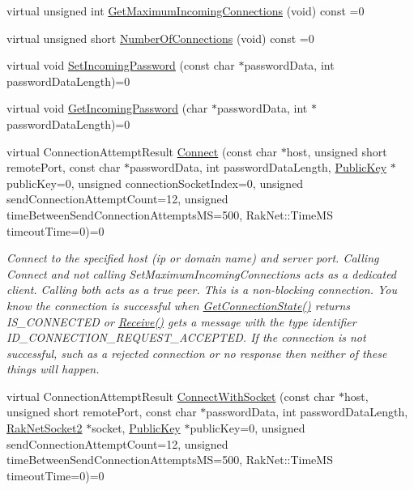 \begin{DoxyCompactItemize}
\item 
virtual unsigned int \hyperlink{class_rak_net_1_1_rak_peer_interface_aa2985b696b46b347f5825e11e7219f83}{Get\-Maximum\-Incoming\-Connections} (void) const =0
\item 
virtual unsigned short \hyperlink{class_rak_net_1_1_rak_peer_interface_a88611e451f6f6e0d5f7cb00ce5bcabf9}{Number\-Of\-Connections} (void) const =0
\item 
virtual void \hyperlink{class_rak_net_1_1_rak_peer_interface_ad18a28a99420006d020125eea1ded4ed}{Set\-Incoming\-Password} (const char $\ast$password\-Data, int password\-Data\-Length)=0
\item 
virtual void \hyperlink{class_rak_net_1_1_rak_peer_interface_a8b5026f40cf8e6f307e2d3ac82970a30}{Get\-Incoming\-Password} (char $\ast$password\-Data, int $\ast$password\-Data\-Length)=0
\item 
virtual Connection\-Attempt\-Result \hyperlink{class_rak_net_1_1_rak_peer_interface_a451dd5d225277fe5806d3d700551fb76}{Connect} (const char $\ast$host, unsigned short remote\-Port, const char $\ast$password\-Data, int password\-Data\-Length, \hyperlink{struct_rak_net_1_1_public_key}{Public\-Key} $\ast$public\-Key=0, unsigned connection\-Socket\-Index=0, unsigned send\-Connection\-Attempt\-Count=12, unsigned time\-Between\-Send\-Connection\-Attempts\-M\-S=500, Rak\-Net\-::\-Time\-M\-S timeout\-Time=0)=0
\begin{DoxyCompactList}\small\item\em Connect to the specified host (ip or domain name) and server port. Calling Connect and not calling Set\-Maximum\-Incoming\-Connections acts as a dedicated client. Calling both acts as a true peer. This is a non-\/blocking connection. You know the connection is successful when \hyperlink{class_rak_net_1_1_rak_peer_interface_a33744f90a202b8e57d6a825d6af080cc}{Get\-Connection\-State()} returns I\-S\-\_\-\-C\-O\-N\-N\-E\-C\-T\-E\-D or \hyperlink{class_rak_net_1_1_rak_peer_interface_a1c50453d9dee600920aeabd62ad7c119}{Receive()} gets a message with the type identifier I\-D\-\_\-\-C\-O\-N\-N\-E\-C\-T\-I\-O\-N\-\_\-\-R\-E\-Q\-U\-E\-S\-T\-\_\-\-A\-C\-C\-E\-P\-T\-E\-D. If the connection is not successful, such as a rejected connection or no response then neither of these things will happen. \end{DoxyCompactList}\item 
virtual Connection\-Attempt\-Result \hyperlink{class_rak_net_1_1_rak_peer_interface_a818333f4aa6365dc1db5b1e3c4c31f64}{Connect\-With\-Socket} (const char $\ast$host, unsigned short remote\-Port, const char $\ast$password\-Data, int password\-Data\-Length, \hyperlink{class_rak_net_1_1_rak_net_socket2}{Rak\-Net\-Socket2} $\ast$socket, \hyperlink{struct_rak_net_1_1_public_key}{Public\-Key} $\ast$public\-Key=0, unsigned send\-Connection\-Attempt\-Count=12, unsigned time\-Between\-Send\-Connection\-Attempts\-M\-S=500, Rak\-Net\-::\-Time\-M\-S timeout\-Time=0)=0

\end{DoxyCompactItemize}
